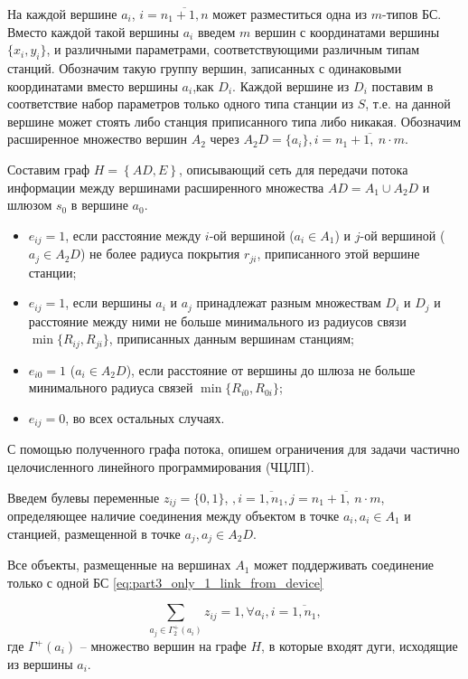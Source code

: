 На каждой вершине $a_i$, $i= \overline{n_1+1,n}$ может разместиться одна из $m$-типов БС. Вместо каждой такой вершины $a_i$ введем $m$ вершин с координатами вершины $\{x_i, y_i \}$, и различными параметрами, соответствующими различным типам станций. Обозначим такую группу вершин, записанных с одинаковыми координатами вместо вершины $a_i$,как $D_i$. Каждой вершине из $D_i$ поставим в соответствие набор параметров только одного типа станции из $S$, т.е. на данной вершине может стоять либо станция приписанного типа либо никакая. Обозначим расширенное множество вершин $A_2$ через $A_2D = \{a_i\}, i = \overline{n_1 + 1,\ n \cdot m}$.


Составим граф $H=\left\{AD,E\right\}$, описывающий сеть для передачи потока информации между вершинами расширенного множества $AD=A_1 \cup A_2D$ и шлюзом $s_0$ в вершине $a_0$.

\begin{itemize}
    \item $e_{ij} = 1$, если расстояние между $i$-ой вершиной ($a_i \in A_1$) и $j$-ой вершиной ($a_j \in A_2D$) не более радиуса покрытия $r_{ji}$, приписанного этой вершине станции;
    \item $e_{ij} = 1$, если вершины $a_i$ и $a_j$ принадлежат разным множествам $D_i$ и $D_j$ и расстояние между ними не больше минимального из радиусов связи $\min\{R_{ij}, R_{ji}\}$, приписанных данным вершинам станциям;
    \item $e_{i0} = 1$ ($a_i \in A_2D$), если расстояние от вершины до шлюза не больше минимального радиуса связей $\min\{R_{i0}, R_{0i}\}$;
    \item $e_{ij} = 0$, во всех остальных случаях.
\end{itemize}


С помощью полученного графа потока, опишем ограничения для задачи частично целочисленного линейного программирования (ЧЦЛП).

Введем булевы переменные $z_{ij} = \{0, 1\}$, $, i = \overline{1,n_1}, j = \overline{n_1+1, \ n \cdot m}$, определяющее наличие соединения между объектом в точке $a_i, a_i \in A_1$  и станцией, размещенной в точке $a_j, a_j \in A_2D$.


Все объекты, размещенные на вершинах $A_1$ может поддерживать соединение только с одной БС \cref{eq:part3_only_1_link_from_device}


\begin{equation}\label{eq:part3_only_1_link_from_device}
    \sum_{a_j \in \Gamma_2^+(a_i)} z_{ij} = 1, \forall a_i, i =\overline{1, n_1},
\end{equation} 
где $\Gamma^+(a_i)$ -- множество вершин на графе $H$, в которые входят дуги, исходящие из вершины $a_i$.

